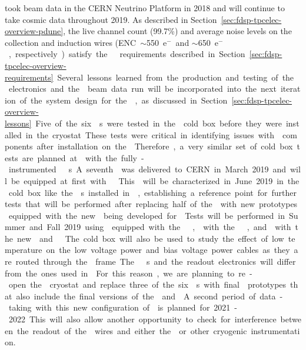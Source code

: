 took beam data in the CERN Neutrino Platform in 2018 and will continue
to take cosmic data throughout 2019. As described in Section~\ref{sec:fdsp-tpcelec-overview-pdune},
the live channel count (99.7\%) and average noise levels on the collection and induction wires 
(ENC~$\sim$\SI{550}{e$^-$} and $\sim$\SI{650}{e$^-$}, respectively) satisfy the  requirements described 
in Section~\ref{sec:fdsp-tpcelec-overview-requirements}. Several lessons learned from the production 
and testing of the  electronics and the  beam data run will be incorporated into the 
next iteration of the system design for the , as discussed in 
Section~\ref{sec:fdsp-tpcelec-overview-lessons}.

Five of the six s were tested in the  cold box
before they were installed in the cryostat. These tests were critical
in identifying issues with  components after installation
on the . Therefore, a very similar set of cold box tests are planned at  
with the fully-instrumented  s. A seventh  was delivered
to CERN in March 2019 and will be equipped at first with  . This
 will be characterized in June 2019 in the cold box like the s installed
in , establishing a reference point for further tests that will be
performed after replacing half of the  with new prototypes equipped with the
new  being developed for . Tests will be performed in Summer and
Fall 2019 using  equipped with the  , 
with the  , and  with the new  and
 . The cold box will also be used to study the effect of
low temperature on the low voltage power and bias voltage power cables as they are 
routed through the  frame.

The  s and the readout electronics will differ from the ones used 
in . For this reason, we are planning to re-open the  cryostat 
and replace three of the six s with final  prototypes that also include 
the final versions of the  and . A second period of data-taking 
with this new configuration of  is planned for 2021-2022. This will also 
allow another opportunity to check for interference between the readout of the  
wires and either the  or other cryogenic instrumentation. 


